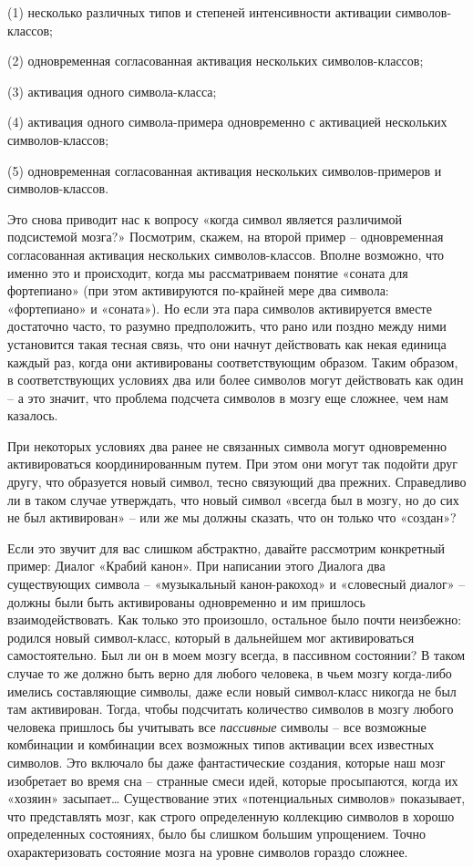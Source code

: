 \documentclass[../main.tex]{subfiles}
\begin{document}
(1) несколько различных типов и степеней интенсивности активации символов-классов;

(2) одновременная согласованная активация нескольких символов-классов;

(3) активация одного символа-класса;

(4) активация одного символа-примера одновременно с активацией нескольких символов-классов;

(5) одновременная согласованная активация нескольких символов-примеров и символов-классов.

Это снова приводит нас к вопросу «когда символ является различимой подсистемой мозга?» Посмотрим, скажем, на второй пример \--- одновременная согласованная активация нескольких символов-классов. Вполне возможно, что именно это и происходит, когда мы рассматриваем понятие «соната для фортепиано» (при этом активируются по-крайней мере два символа: «фортепиано» и «соната»). Но если эта пара символов активируется вместе достаточно часто, то разумно предположить, что рано или поздно между ними установится такая тесная связь, что они начнут действовать как некая единица каждый раз, когда они активированы соответствующим образом. Таким образом, в соответствующих условиях два или более символов могут действовать как один \--- а это значит, что проблема подсчета символов в мозгу еще сложнее, чем нам казалось.

При некоторых условиях два ранее не связанных символа могут одновременно активироваться координированным путем. При этом они могут так подойти друг другу, что образуется новый символ, тесно связующий два прежних. Справедливо ли в таком случае утверждать, что новый символ «всегда был в мозгу, но до сих не был активирован» \--- или же мы должны сказать, что он только что «создан»?

Если это звучит для вас слишком абстрактно, давайте рассмотрим конкретный пример: Диалог «Крабий канон». При написании этого Диалога два существующих символа \--- «музыкальный канон-ракоход» и «словесный диалог» \--- должны были быть активированы одновременно и им пришлось взаимодействовать. Как только это произошло, остальное было почти неизбежно: родился новый символ-класс, который в дальнейшем мог активироваться самостоятельно. Был ли он в моем мозгу всегда, в пассивном состоянии? В таком случае то же должно быть верно для любого человека, в чьем мозгу когда-либо имелись составляющие символы, даже если новый символ-класс никогда не был там активирован. Тогда, чтобы подсчитать количество символов в мозгу любого человека пришлось бы учитывать все \emph{пассивные} символы \--- все возможные комбинации и комбинации всех возможных типов активации всех известных символов. Это включало бы даже фантастические создания, которые наш мозг изобретает во время сна \--- странные смеси идей, которые просыпаются, когда их «хозяин» засыпает\ldots{} Существование этих «потенциальных символов» показывает, что представлять мозг, как строго определенную коллекцию символов в хорошо определенных состояниях, было бы слишком большим упрощением. Точно охарактеризовать состояние мозга на уровне символов гораздо сложнее.
\end{document}
